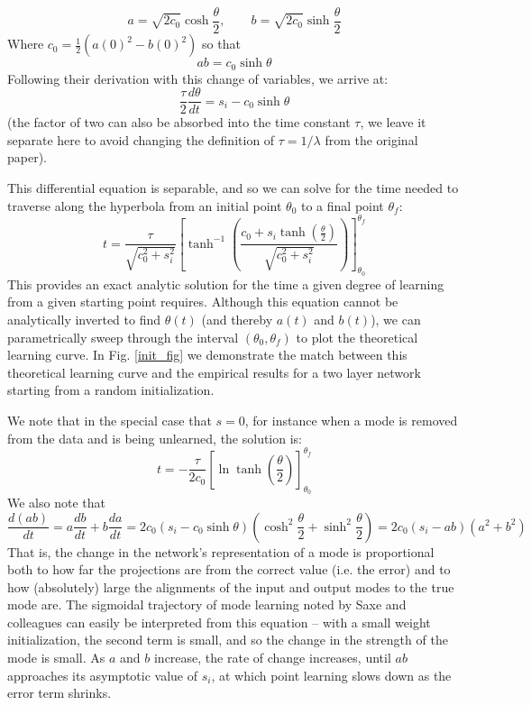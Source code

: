 \documentclass{article}
\begin{document}
$$a = \sqrt{2c_0} \cosh \frac{\theta}{2}, \qquad b = \sqrt{2c_0} \sinh \frac{\theta}{2}$$
Where $c_0 = \frac{1}{2} (a(0)^2-b(0)^2)$ so that
$$ab = c_0 \sinh \theta$$
Following their derivation with this change of variables, we arrive at:
$$\frac{\tau}{2} \frac{d\theta}{dt} = s_i - c_0 \sinh \theta$$
(the factor of two can also be absorbed into the time constant $\tau$, we leave it separate here to avoid changing the definition of $\tau = 1/\lambda$ from the original paper). \par
This differential equation is separable, and so we can solve for the time needed to traverse along the hyperbola from an initial point $\theta_0$ to a final point $\theta_f$:
\begin{equation} \label{t_eqn} 
t = \frac{\tau}{\sqrt{c_0^2 + s_i^2}} \left[\tanh^{-1} \left( \frac{c_0 + s_i \tanh\left( \frac{\theta}{2} \right)}{\sqrt{c_0^2+s_i^2}}\right)\right]_{\theta_0}^{\theta_f}
\end{equation}%
This provides an exact analytic solution for the time a given degree of learning from a given starting point requires. Although this equation cannot be analytically inverted to find $\theta(t)$ (and thereby $a(t)$ and $b(t)$), we can parametrically sweep through the interval $(\theta_0, \theta_f)$ to plot the theoretical learning curve. In Fig. \ref{init_fig} we demonstrate the match between this theoretical learning curve and the empirical results for a two layer network starting from a random initialization. \par
We note that in the special case that \(s = 0\), for instance when a mode is removed from the data and is being unlearned, the solution is:
\begin{equation} \label{t_eqn_s_zero} 
t = -\frac{\tau}{2c_0} \left[\ln \tanh \left(\frac{\theta}{2}\right)\right]_{\theta_0}^{\theta_f}
\end{equation}%
We also note that 
$$\frac{d(ab)}{dt} = a \frac{db}{dt} + b \frac{da}{dt} = 2 c_0 (s_i - c_0 \sinh \theta) \left( \cosh^2 \frac{\theta}{2} + \sinh^2 \frac{\theta}{2} \right) = 2 c_0 \left(s_i - ab\right) \left(a^2 + b^2 \right)$$
That is, the change in the network's representation of a mode is proportional both to how far the projections are from the correct value (i.e. the error) and to how (absolutely) large the alignments of the input and output modes to the true mode are. The sigmoidal trajectory of mode learning noted by Saxe and colleagues can easily be interpreted from this equation -- with a small weight initialization, the second term is small, and so the change in the strength of the mode is small. As $a$ and $b$ increase, the rate of change increases, until $ab$ approaches its asymptotic value of $s_i$, at which point learning slows down as the error term shrinks. \par
\end{document}
